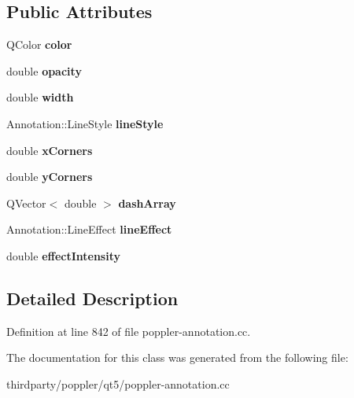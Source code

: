 \subsection*{Public Attributes}
\begin{DoxyCompactItemize}
\item 
\mbox{\label{class_poppler_1_1_annotation_1_1_style_1_1_private_a81bae3952d13daf7946a476284f94461}} 
Q\+Color {\bfseries color}
\item 
\mbox{\label{class_poppler_1_1_annotation_1_1_style_1_1_private_a75e37653a5ead9e030e76edf66adf056}} 
double {\bfseries opacity}
\item 
\mbox{\label{class_poppler_1_1_annotation_1_1_style_1_1_private_a6deadf02ff5c11d0386b7fb8f512d480}} 
double {\bfseries width}
\item 
\mbox{\label{class_poppler_1_1_annotation_1_1_style_1_1_private_a821ed671c0947320c03bff8b69343fb5}} 
Annotation\+::\+Line\+Style {\bfseries line\+Style}
\item 
\mbox{\label{class_poppler_1_1_annotation_1_1_style_1_1_private_a299012590f3e81774d2f43dc4497ec16}} 
double {\bfseries x\+Corners}
\item 
\mbox{\label{class_poppler_1_1_annotation_1_1_style_1_1_private_a2a15f78b4adc4135e7bf614c1a568e5a}} 
double {\bfseries y\+Corners}
\item 
\mbox{\label{class_poppler_1_1_annotation_1_1_style_1_1_private_ab56a481b63be7111e3387471fe006114}} 
Q\+Vector$<$ double $>$ {\bfseries dash\+Array}
\item 
\mbox{\label{class_poppler_1_1_annotation_1_1_style_1_1_private_a08f053a563a3e0723e83160be80b294c}} 
Annotation\+::\+Line\+Effect {\bfseries line\+Effect}
\item 
\mbox{\label{class_poppler_1_1_annotation_1_1_style_1_1_private_aa06b26604303f5d4b2ba419022d075a5}} 
double {\bfseries effect\+Intensity}
\end{DoxyCompactItemize}


\subsection{Detailed Description}


Definition at line 842 of file poppler-\/annotation.\+cc.



The documentation for this class was generated from the following file\+:\begin{DoxyCompactItemize}
\item 
thirdparty/poppler/qt5/poppler-\/annotation.\+cc\end{DoxyCompactItemize}
